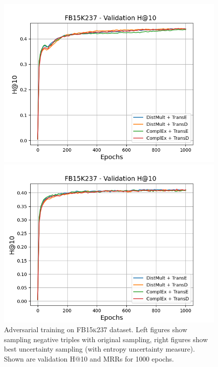 \begin{figure}[H]
\begin{minipage}{.5\textwidth}
    \end{minipage}
    \begin{minipage}{.5\textwidth}
      \centering
      \includegraphics[width=0.9\linewidth]{figures/results/gan_train/not_pretrained/random/fb15k237/epochs1000/random_fb15k237_hit10.png}
    \end{minipage}%
    \begin{minipage}{.5\textwidth}
      \centering
      \includegraphics[width=0.9\linewidth]{figures/results/gan_train/not_pretrained/uncertainty/max_distribution/entropy/fb15k237/1k_epochs/uncertainty_fb15k237_hit10.png}
    \end{minipage}%
    \caption{Adversarial training on \textsc{FB15k237} dataset. 
    Left figures show sampling negative triples with original sampling, right figures show best uncertainty sampling (\ussoftmax with entropy uncertainty measure).
    Shown are validation H@10 and MRRs for 1000 epochs.}
    \label{fig:advtrain_fb15k237_random_vs_uncertainty}
\end{figure}


